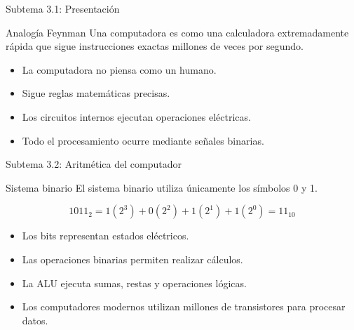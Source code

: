 \documentclass[10pt,aspectratio=169]{beamer}
\begin{document}
	\begin{frame}{Subtema 3.1: Presentación}
		
		\begin{block}{Analogía Feynman}
			Una computadora es como una calculadora extremadamente rápida que sigue instrucciones exactas millones de veces por segundo.
		\end{block}
		
		\begin{itemize}
			\item La computadora no piensa como un humano.
			\item Sigue reglas matemáticas precisas.
			\item Los circuitos internos ejecutan operaciones eléctricas.
			\item Todo el procesamiento ocurre mediante señales binarias.
		\end{itemize}
		
	\end{frame}
	
	
	\begin{frame}{Subtema 3.2: Aritmética del computador}
		
		\small
		
		\begin{block}{Sistema binario}
			El sistema binario utiliza únicamente los símbolos 0 y 1.
		\end{block}
		
		\[
		1011_2 =
		1(2^3)+0(2^2)+1(2^1)+1(2^0)=11_{10}
		\]
		
		\begin{itemize}
			\item Los bits representan estados eléctricos.
			\item Las operaciones binarias permiten realizar cálculos.
			\item La ALU ejecuta sumas, restas y operaciones lógicas.
			\item Los computadores modernos utilizan millones de transistores para procesar datos.
		\end{itemize}
		
	\end{frame}
	
	
\end{document}
